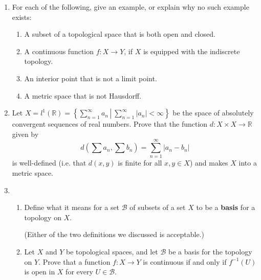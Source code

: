 \documentclass[12pt]{article}
\newcommand{\points}[1]{\marginpar{\hspace{24pt}[#1]}}
\newcommand{\R}{\mathbb{R}}
\newcommand{\abs}[1]{\lvert #1\rvert}
\begin{document}
\begin{enumerate}
\item For each of the following, give an example, or explain why no such example exists:
\begin{enumerate}
\item A subset of a topological space that is both open and closed. \points{3}

\vspace{1.6in}

\item A continuous function $f:X\to Y$, if $X$ is equipped with the indiscrete topology. \points{3}

\vspace{1.8in}

\item An interior point that is not a limit point. \points{3}

\vspace{1.8in}

\item A metric space that is not Hausdorff. \points{3}
\end{enumerate}
\newpage

\item Let $X=\displaystyle l^1(\mathbb{R}) = \left\{\sum_{n=1}^\infty a_n \,\left|\: \sum_{n=1}^\infty\abs{a_n}<\infty\right.\right\}$ be the space of absolutely convergent sequences of real numbers. Prove that the function $d:X\times X\to\R$ given by \points{8}
\[
d\left(\sum a_n, \sum b_n\right) = \sum_{n=1}^\infty\abs{a_n-b_n}
\]
is well-defined (i.e. that $d(x,y)$ is finite for all $x,y\in X$) and makes $X$ into a metric space.

\newpage

\item \begin{enumerate}
\item Define what it means for a set $\mathcal{B}$ of subsets of a set $X$ to be a {\bf basis} for a topology on $X$. \points{3}

(Either of the two definitions we discussed is acceptable.)

\vspace{2in}

\item Let $X$ and $Y$ be topological spaces, and let $\mathcal{B}$ be a basis for the topology on $Y$. Prove that a function $f:X\to Y$ is continuous if and only if $f^{-1}(U)$ is open in $X$ for every $U\in\mathcal{B}$. \points{6}
\end{enumerate}
\newpage


\end{enumerate}
\end{document}
